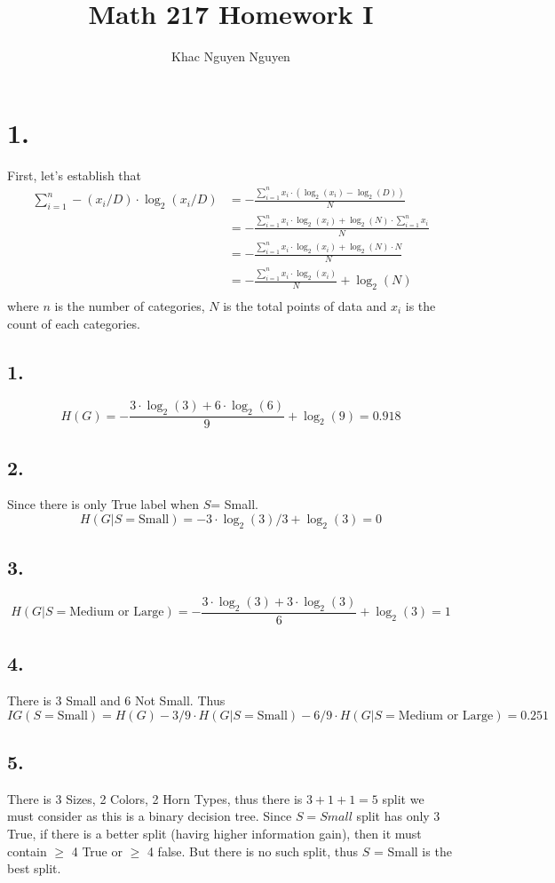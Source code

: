 \documentclass[11pt]{article}
\title{\textbf{Math 217 Homework I}}
\author{Khac Nguyen Nguyen}
\date{}
\theoremstyle{mystyle}
\theoremstyle{definition}
\begin{document}
\section*{1.}
First, let's establish that 
\begin{align*}
  \sum_{i=1}^n - (x_i / D) \cdot \log_2(x_i/D) 
  &= - \frac{\sum_{i=1}^n x_i \cdot (\log_2(x_i) - \log_2(D))}{N} \\
  &= -\frac{\sum_{i=1}^n x_i \cdot \log_2(x_i) + \log_2(N) \cdot \sum_{i=1}^n x_i}{N} \\ 
  &= -\frac{\sum_{i=1}^n x_i \cdot \log_2(x_i) + \log_2(N) \cdot N}{N} \\
  &= -\frac{\sum_{i=1}^n x_i \cdot \log_2(x_i)}{N} + \log_2(N) \\
\end{align*}
where $n$ is the number of categories, $N$ is the total points of data and $x_i$ is the count of each categories. 
\subsection*{1.}
\[
  H(G) = - \frac{3 \cdot \log_2(3) + 6 \cdot \log_2(6)}{9} + \log_2(9) = 0.918 
\]
\subsection*{2.}
Since there is only True label when $S$= Small. 
\[
  H(G|S=\text{Small}) = - 3 \cdot \log_2(3) / 3 + \log_2(3) = 0
\]
\subsection*{3.}
\[
  H(G|S = \text{Medium or Large}) = -\frac{3 \cdot \log_2(3) + 3 \cdot \log_2(3)}{6} + \log_2(3) = 1 
\]
\subsection*{4.}
There is 3 Small and 6 Not Small. Thus 
\[
  IG(S = \text{Small}) = H(G) - 3/9 \cdot H(G|S = \text{Small}) - 6/9 \cdot H(G|S = \text{Medium or Large}) = 
 0.251
\]
\subsection*{5.} 
There is 3 Sizes, 2 Colors, 2 Horn Types, thus there is $3 + 1 + 1= 5$ split we must consider as this is a binary decision tree. Since $S = Small$ split has only 3 True, if there is a better split (havirg higher information gain), then it must contain $\ge$ 4 True or $\ge$ 4 false. But there is no such split, thus $S$ = Small is the best split. 
\end{document}
